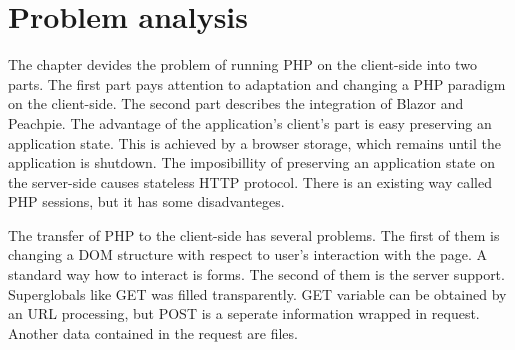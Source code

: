 \chapter{Problem analysis}

The chapter devides the problem of running PHP on the client-side into two parts.
The first part pays attention to adaptation and changing a PHP paradigm on the client-side.
The second part describes the integration of Blazor and Peachpie. 
The advantage of the application's client's part is easy preserving an application state.
This is achieved by a browser storage, which remains until the application is shutdown.
The imposibillity of preserving an application state on the server-side causes stateless HTTP protocol. There is an existing way called PHP sessions, but it has some disadvanteges.

The transfer of PHP to the client-side has several problems. 
The first of them is changing a DOM structure with respect to user's interaction with the page.
A standard way how to interact is forms.
The second of them is the server support.
Superglobals like GET was filled transparently.
GET variable can be obtained by an URL processing, but POST is a seperate information wrapped in request.
Another data contained in the request are files.






